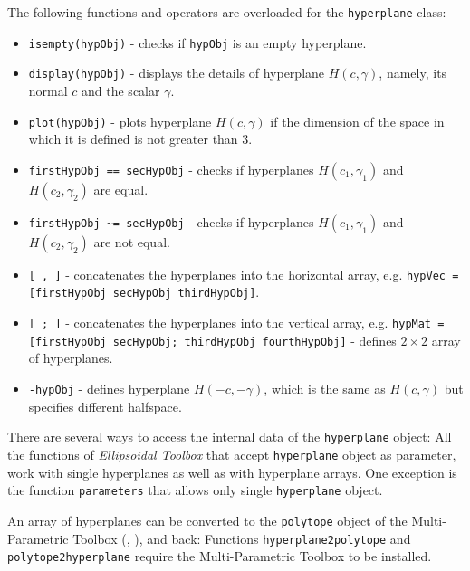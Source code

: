 The following functions and operators are overloaded for the
{\tt hyperplane} class:
\begin{itemize}
\item {\tt isempty(hypObj)} - checks if {\tt hypObj} is an empty hyperplane.
\item {\tt display(hypObj)} - displays the details of hyperplane $H(c,\gamma)$,
namely, its normal $c$ and the scalar $\gamma$.
\item {\tt plot(hypObj)} - plots hyperplane $H(c,\gamma)$ if the dimension of the
space in which it is defined  is not greater than 3.
\item {\tt firstHypObj == secHypObj} - checks if hyperplanes $H(c_1,\gamma_1)$ and
$H(c_2,\gamma_2)$ are equal.
\item {\tt firstHypObj \~{ }= secHypObj} - checks if hyperplanes $H(c_1,\gamma_1)$ and
$H(c_2,\gamma_2)$ are not equal.
\item {\tt [ , ]} - concatenates the hyperplanes into the horizontal array, e.g.
{\tt hypVec = [firstHypObj secHypObj thirdHypObj]}.
\item {\tt [ ; ]} - concatenates the hyperplanes into the vertical array, e.g.
{\tt hypMat = [firstHypObj secHypObj; thirdHypObj fourthHypObj]} - defines $2\times 2$ array of hyperplanes.
\item {\tt -hypObj} - defines hyperplane $H(-c,-\gamma)$, which is the same
as $H(c,\gamma)$ but specifies different halfspace.
\end{itemize}

There are several ways to access the internal data of the {\tt hyperplane}
object:
All the functions of {\it Ellipsoidal Toolbox} that accept {\tt hyperplane}
object as parameter, work with single hyperplanes as well as with hyperplane
arrays. One exception is the function {\tt parameters} that allows only
single {\tt hyperplane} object.

An array of hyperplanes can be converted to the {\tt polytope} object of the
Multi-Parametric Toolbox (\cite{KVASNICA_GRIEDER_BAOTIC_MORARI_HYBRID_SYSTEMS_COMPUTATION_AND_CONTROL}, \cite{MULTI_PARAMETRIC_TOOLBOX_HOMEPAGE}), and back:
Functions {\tt hyperplane2polytope} and {\tt polytope2hyperplane} require
the Multi-Parametric Toolbox to be installed.

